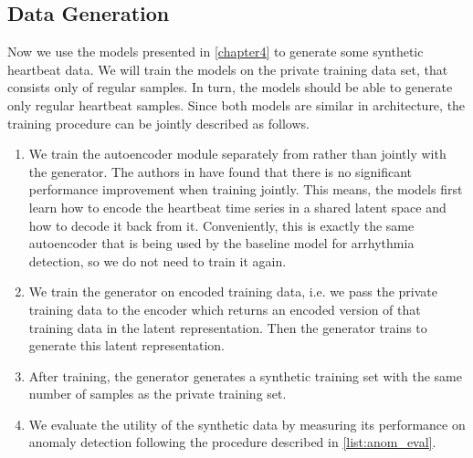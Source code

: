 \subsection{Data Generation}
Now we use the models presented in \cref{chapter4} to generate some synthetic heartbeat data. We will train the models on the private training data set, that consists only of regular samples. In turn, the models should be able to generate only regular heartbeat samples. Since both models are similar in architecture, the training procedure can be jointly described as follows.
\begin{enumerate}
    \item We train the autoencoder module separately from rather than jointly with the generator. The authors in \parencite{pei2021towards} have found that there is no significant performance improvement when training jointly. This means, the models first learn how to encode the heartbeat time series in a shared latent space and how to decode it back from it. Conveniently, this is exactly the same autoencoder that is being used by the baseline model for arrhythmia detection, so we do not need to train it again.
    \item We train the generator on encoded training data, i.e. we pass the private training data to the encoder which returns an encoded version of that training data in the latent representation. Then the generator trains to generate this latent representation.
    \item After training, the generator generates a synthetic training set with the same number of samples as the private training set.
    \item We evaluate the utility of the synthetic data by measuring its performance on anomaly detection following the procedure described in \cref{list:anom_eval}.
\end{enumerate}

